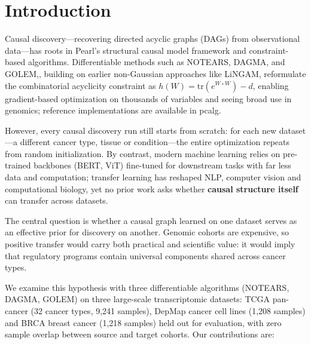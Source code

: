 \documentclass{ws-jbcb}
\begin{document}

\section{Introduction}

Causal discovery---recovering directed acyclic graphs (DAGs) from observational data---has roots in Pearl's structural causal model framework\cite{pearl2009causality} and constraint-based algorithms.\cite{spirtes2000causation} Differentiable methods such as NOTEARS,\cite{zheng2018} DAGMA,\cite{bello2022} and GOLEM,\cite{ng2020}, building on earlier non-Gaussian approaches like LiNGAM,\cite{shimizu2006linear} reformulate the combinatorial acyclicity constraint as $h(W) = \mathrm{tr}(e^{W \circ W}) - d$, enabling gradient-based optimization on thousands of variables and seeing broad use in genomics; reference implementations are available in pcalg.\cite{kalisch2012causal}

However, every causal discovery run still starts from scratch: for each new dataset---a different cancer type, tissue or condition---the entire optimization repeats from random initialization. By contrast, modern machine learning relies on pre-trained backbones (BERT,\cite{devlin2019} ViT\cite{dosovitskiy2021}) fine-tuned for downstream tasks with far less data and computation; transfer learning has reshaped NLP, computer vision and computational biology,\cite{weiss2016transfer,zhuang2020transfer,theodoris2023transfer} yet no prior work asks whether \textbf{causal structure itself} can transfer across datasets.

The central question is whether a causal graph learned on one dataset serves as an effective prior for discovery on another. Genomic cohorts are expensive, so positive transfer would carry both practical and scientific value: it would imply that regulatory programs contain universal components shared across cancer types.

We examine this hypothesis with three differentiable algorithms (NOTEARS, DAGMA, GOLEM) on three large-scale transcriptomic datasets: TCGA pan-cancer (32 cancer types, 9,241 samples),\cite{weinstein2013,hoadley2018cell,liu2018comparative} DepMap cancer cell lines (1,208 samples)\cite{tsherniak2017} and BRCA breast cancer (1,218 samples)\cite{tcga2012breast} held out for evaluation, with zero sample overlap between source and target cohorts. Our contributions are:
\end{document}
